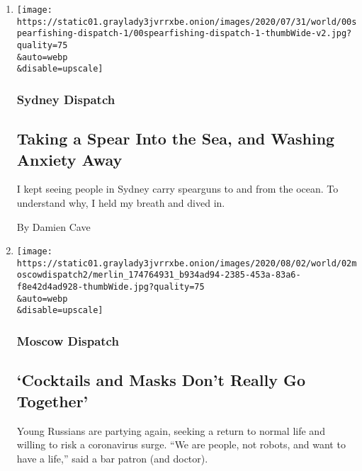 \begin{enumerate}
\def\labelenumi{\arabic{enumi}.}
\item
  \href{/2020/08/03/world/australia/spearfishing-sydney-coronavirus.html}{}

  \texttt{[image: https://static01.graylady3jvrrxbe.onion/images/2020/07/31/world/00spearfishing-dispatch-1/00spearfishing-dispatch-1-thumbWide-v2.jpg?quality=75\\\&auto=webp\\\&disable=upscale]}

  \hypertarget{sydney-dispatch}{%
  \subsubsection{Sydney Dispatch}\label{sydney-dispatch}}

  \hypertarget{taking-a-spear-into-the-sea-and-washing-anxiety-away}{%
  \subsection{Taking a Spear Into the Sea, and Washing Anxiety
  Away}\label{taking-a-spear-into-the-sea-and-washing-anxiety-away}}

  I kept seeing people in Sydney carry spearguns to and from the ocean.
  To understand why, I held my breath and dived in.

  By Damien Cave
\item
  \href{/2020/08/01/world/europe/russia-moscow-coronavirus.html}{}

  \texttt{[image: https://static01.graylady3jvrrxbe.onion/images/2020/08/02/world/02moscowdispatch2/merlin\_174764931\_b934ad94-2385-453a-83a6-f8e42d4ad928-thumbWide.jpg?quality=75\\\&auto=webp\\\&disable=upscale]}

  \hypertarget{moscow-dispatch}{%
  \subsubsection{Moscow Dispatch}\label{moscow-dispatch}}

  \hypertarget{cocktails-and-masks-dont-really-go-together}{%
  \subsection{`Cocktails and Masks Don't Really Go
  Together'}\label{cocktails-and-masks-dont-really-go-together}}

  Young Russians are partying again, seeking a return to normal life and
  willing to risk a coronavirus surge. ``We are people, not robots, and
  want to have a life,'' said a bar patron (and doctor).


\end{enumerate}
